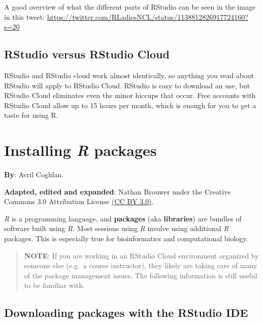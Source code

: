 \documentclass[
]{book}
\begin{document}
A good overview of what the different parts of RStudio can be seen in the image in this tweet: \url{https://twitter.com/RLadiesNCL/status/1138812826917724160?s=20}

\hypertarget{rstudio-versus-rstudio-cloud}{%
\section{RStudio versus RStudio Cloud}\label{rstudio-versus-rstudio-cloud}}

RStudio and RStudio cloud work almost identically, so anything you read about RStudio will apply to RStudio Cloud. RStudio is easy to download an use, but RStudio Cloud eliminates even the minor hiccups that occur. Free accounts with RStudio Cloud allow up to 15 hours per month, which is enough for you to get a taste for using R.

\hypertarget{installing-r-packages}{%
\chapter{\texorpdfstring{Installing \emph{R} packages}{Installing R packages}}\label{installing-r-packages}}

\textbf{By}: Avril Coghlan.

\textbf{Adapted, edited and expanded}: Nathan Brouwer under the Creative Commons 3.0 Attribution License \href{https://creativecommons.org/licenses/by/3.0/}{(CC BY 3.0)}.

\emph{R} is a programming language, and \textbf{packages} (aka \textbf{libraries}) are bundles of software built using \emph{R}. Most sessions using \emph{R} involve using additional \emph{R} packages. This is especially true for bioinformatics and computational biology.

\begin{quote}
\textbf{NOTE}: If you are working in an RStudio Cloud environment organized by someone else (e.g.~a course instructor), they likely are taking care of many of the package management issues. The following information is still useful to be familiar with.
\end{quote}

\hypertarget{downloading-packages-with-the-rstudio-ide}{%
\section{Downloading packages with the RStudio IDE}\label{downloading-packages-with-the-rstudio-ide}}
\end{document}
